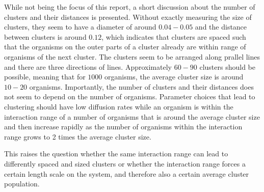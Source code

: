 \documentclass{article}
\begin{document}
While not being the focus of this report, a short discussion about the number of clusters and their distances is presented.
Without exactly measuring the size of clusters, they seem to have a diameter of around $0.04-0.05$ and the distance between clusters is around $0.12$, which indicates that clusters are spaced such that the organisms on the outer parts of a cluster already are within range of organisms of the next cluster. 
The clusters seem to be arranged along prallel lines and there are three directions of lines. 
Approximately $60-90$ clusters should be possible, meaning that for $1000$ organisms, the average cluster size is around $10-20$ organisms.
Importantly, the number of clusters and their distances does not seem to depend on the number of organisms.
Parameter choices that lead to clustering should have low diffusion rates while an organism is within the interaction range of a number of organisms that is around the average cluster size and then increase rapidly as the number of organisms within the interaction range grows to 2 times the average cluster size. 

This raises the question whether the same interaction range can lead to differently spaced and sized clusters or whether the interaction range forces a certain length scale on the system, and therefore also a certain average cluster population.

\printbibliography
\end{document}

